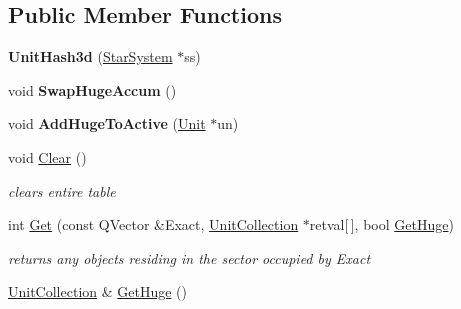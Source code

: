 \subsection*{Public Member Functions}
\begin{DoxyCompactItemize}
\item 
{\bfseries Unit\+Hash3d} (\hyperlink{classStarSystem}{Star\+System} $\ast$ss)\hypertarget{classUnitHash3d_acde1661955c90a68a20f18dec50b919c}{}\label{classUnitHash3d_acde1661955c90a68a20f18dec50b919c}

\item 
void {\bfseries Swap\+Huge\+Accum} ()\hypertarget{classUnitHash3d_acb3d1be880e1b5ad0793e5bb8491fcd5}{}\label{classUnitHash3d_acb3d1be880e1b5ad0793e5bb8491fcd5}

\item 
void {\bfseries Add\+Huge\+To\+Active} (\hyperlink{classUnit}{Unit} $\ast$un)\hypertarget{classUnitHash3d_a88137f5e409afad39c441ce808ec1634}{}\label{classUnitHash3d_a88137f5e409afad39c441ce808ec1634}

\item 
void \hyperlink{classUnitHash3d_afaed7ef5a39d039f89ee6b19b00d0bfd}{Clear} ()\hypertarget{classUnitHash3d_afaed7ef5a39d039f89ee6b19b00d0bfd}{}\label{classUnitHash3d_afaed7ef5a39d039f89ee6b19b00d0bfd}

\begin{DoxyCompactList}\small\item\em clears entire table \end{DoxyCompactList}\item 
int \hyperlink{classUnitHash3d_a72d6ee0e0dcbcb5dc65179d70e51b82c}{Get} (const Q\+Vector \&Exact, \hyperlink{classUnitCollection}{Unit\+Collection} $\ast$retval\mbox{[}$\,$\mbox{]}, bool \hyperlink{classUnitHash3d_af4af4ef118380adeadd72fe201beb00a}{Get\+Huge})\hypertarget{classUnitHash3d_a72d6ee0e0dcbcb5dc65179d70e51b82c}{}\label{classUnitHash3d_a72d6ee0e0dcbcb5dc65179d70e51b82c}

\begin{DoxyCompactList}\small\item\em returns any objects residing in the sector occupied by Exact \end{DoxyCompactList}\item 
\hyperlink{classUnitCollection}{Unit\+Collection} \& \hyperlink{classUnitHash3d_af4af4ef118380adeadd72fe201beb00a}{Get\+Huge} ()\hypertarget{classUnitHash3d_af4af4ef118380adeadd72fe201beb00a}{}\label{classUnitHash3d_af4af4ef118380adeadd72fe201beb00a}


\end{DoxyCompactItemize}
